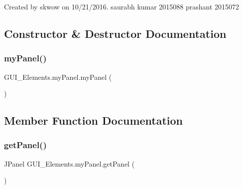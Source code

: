 Created by skwow on 10/21/2016. saurabh kumar 2015088 prashant 2015072 

\subsection{Constructor \& Destructor Documentation}
\hypertarget{class_g_u_i___elements_1_1my_panel_a86c5274d56125927194bdb681d40a3bc}{}\label{class_g_u_i___elements_1_1my_panel_a86c5274d56125927194bdb681d40a3bc} 
\subsubsection{\texorpdfstring{my\+Panel()}{myPanel()}}
{\footnotesize\ttfamily G\+U\+I\+\_\+\+Elements.\+my\+Panel.\+my\+Panel (\begin{DoxyParamCaption}{ }\end{DoxyParamCaption})}



\subsection{Member Function Documentation}
\hypertarget{class_g_u_i___elements_1_1my_panel_abea57f39e7c7b1c89db73d173d71d978}{}\label{class_g_u_i___elements_1_1my_panel_abea57f39e7c7b1c89db73d173d71d978} 
\subsubsection{\texorpdfstring{get\+Panel()}{getPanel()}}
{\footnotesize\ttfamily J\+Panel G\+U\+I\+\_\+\+Elements.\+my\+Panel.\+get\+Panel (\begin{DoxyParamCaption}{ }\end{DoxyParamCaption})}

\hypertarget{class_g_u_i___elements_1_1my_panel_a0e7ebb816b28db3b3ee0af444afc7b32}{}\label{class_g_u_i___elements_1_1my_panel_a0e7ebb816b28db3b3ee0af444afc7b32} 
